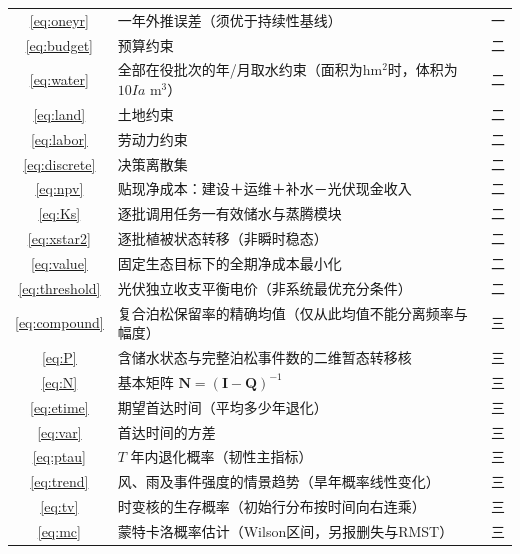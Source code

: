 \documentclass[11pt,a4paper]{ctexart}
\begin{document}
\begin{longtable}{|c|p{7.4cm}|c|}
\eqref{eq:oneyr} & 一年外推误差（须优于持续性基线） & 一 \\
\eqref{eq:budget} & 预算约束 & 二 \\
\eqref{eq:water} & 全部在役批次的年/月取水约束（面积为hm$^2$时，体积为$10Ia$ m$^3$） & 二 \\
\eqref{eq:land} & 土地约束 & 二 \\
\eqref{eq:labor} & 劳动力约束 & 二 \\
\eqref{eq:discrete} & 决策离散集 & 二 \\
\eqref{eq:npv} & 贴现净成本：建设＋运维＋补水－光伏现金收入 & 二 \\
\eqref{eq:Ks} & 逐批调用任务一有效储水与蒸腾模块 & 二 \\
\eqref{eq:xstar2} & 逐批植被状态转移（非瞬时稳态） & 二 \\
\eqref{eq:value} & 固定生态目标下的全期净成本最小化 & 二 \\
\eqref{eq:threshold} & 光伏独立收支平衡电价（非系统最优充分条件） & 二 \\
\eqref{eq:compound} & 复合泊松保留率的精确均值（仅从此均值不能分离频率与幅度） & 三 \\
\eqref{eq:P} & 含储水状态与完整泊松事件数的二维暂态转移核 & 三 \\
\eqref{eq:N} & 基本矩阵 $\bm{N}=(\bm{I}-\bm{Q})^{-1}$ & 三 \\
\eqref{eq:etime} & 期望首达时间（平均多少年退化） & 三 \\
\eqref{eq:var} & 首达时间的方差 & 三 \\
\eqref{eq:ptau} & $T$ 年内退化概率（韧性主指标） & 三 \\
\eqref{eq:trend} & 风、雨及事件强度的情景趋势（旱年概率线性变化） & 三 \\
\eqref{eq:tv} & 时变核的生存概率（初始行分布按时间向右连乘） & 三 \\
\eqref{eq:mc} & 蒙特卡洛概率估计（Wilson区间，另报删失与RMST） & 三 \\
\hline
\end{longtable}
\end{document}
